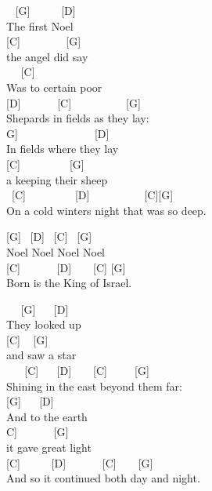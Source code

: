 \documentclass[
  letterpaper,
]{scrbook}
\begin{document}
~ {[}G{]} ~ ~ ~ {[}D{]}\\
The first Noel\\
\hspace*{0.333em} {[}C{]} ~ ~ ~ ~ ~{[}G{]}\\
the angel did say\\
\hspace*{0.333em} ~ ~{[}C{]}\\
Was to certain poor\\
{[}D{]} ~ ~ ~ ~{[}C{]} ~ ~ ~ ~ ~ ~{[}G{]}\\
Shepards in fields as they lay:\\
\hspace*{0.333em}{[}G{]} ~ ~ ~ ~ ~ ~ ~ ~ {[}D{]}\\
In fields where they lay\\
{[}C{]} ~ ~ ~ ~ ~ {[}G{]}\\
a keeping their sheep\\
\hspace*{0.333em} ~{[}C{]} ~ ~ ~ ~ ~ {[}D{]} ~ ~ ~ ~ ~ ~{[}C{]}{[}G{]}\\
On a cold winter\textquotesingle s night that was so deep.

{[}G{]} ~{[}D{]} ~{[}C{]} ~{[}G{]}\\
Noel Noel Noel Noel\\
{[}C{]} ~ ~ ~ ~{[}D{]} ~ ~ {[}C{]} {[}G{]}\\
Born is the King of Israel.

~ ~{[}G{]} ~ ~{[}D{]} ~\\
They looked up\\
\hspace*{0.333em} {[}C{]} ~ {[}G{]}\\
and saw a star\\
\hspace*{0.333em} ~ ~ {[}C{]} ~ ~{[}D{]} ~ ~ {[}C{]} ~ ~ ~{[}G{]}\\
Shining in the east beyond them far:\\
\hspace*{0.333em} {[}G{]} ~ ~{[}D{]} ~ ~ ~\\
And to the earth\\
\hspace*{0.333em}{[}C{]} ~ ~ ~ ~{[}G{]}\\
it gave great light\\
\hspace*{0.333em} {[}C{]} ~ ~ ~ {[}D{]} ~ ~ ~ ~{[}C{]} ~ ~ {[}G{]}\\
And so it continued both day and night.
\end{document}
